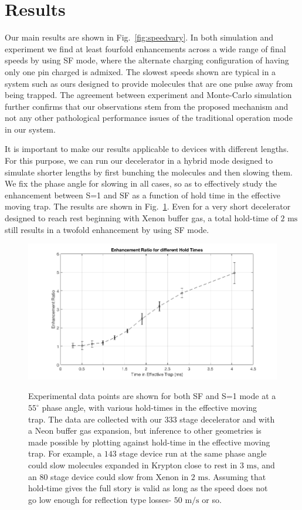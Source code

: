 \documentclass[%
 reprint,
 amsmath,amssymb,
 aps,
pra,
]{revtex4-1}
\begin{document}
\section{Results}
Our main results are shown in Fig.~\ref{fig:speedvary}. In both simulation and experiment we find at least fourfold enhancements across a wide range of final speeds by using SF mode, where the alternate charging configuration of having only one pin charged is admixed. The slowest speeds shown are typical in a system such as ours designed to provide molecules that are one pulse away from being trapped. The agreement between experiment and Monte-Carlo simulation further confirms that our observations stem from the proposed mechanism and not any other pathological performance issues of the traditional operation mode in our system.

It is important to make our results applicable to devices with different lengths. For this purpose, we can run our decelerator in a hybrid mode designed to simulate shorter lengths by first bunching the molecules and then slowing them. We fix the phase angle for slowing in all cases, so as to effectively study the enhancement between S=1 and SF as a function of hold time in the effective moving trap. The results are shown in Fig.~\ref{fig:holdtime}. Even for a very short decelerator designed to reach rest beginning with Xenon buffer gas, a total hold-time of $2\text{ ms}$ still results in a twofold enhancement by using SF mode.

\begin{figure}[t]
\includegraphics[width=\linewidth]{Data/ratio-holdtime.png}
\label{fig:holdtime}
\caption{
Experimental data points are shown for both SF and S=1 mode at a $55^\circ$ phase angle, with various hold-times in the effective moving trap. The data are collected with our $333$ stage decelerator and with a Neon buffer gas expansion, but inference to other geometries is made possible by plotting against hold-time in the effective moving trap. For example, a $143$ stage device run at the same phase angle could slow molecules expanded in Krypton close to rest in $3\text{ ms}$, and an $80$ stage device could slow from Xenon in $2\text{ ms}$. Assuming that hold-time gives the full story is valid as long as the speed does not go low enough for reflection type losses- $50\text{ m/s}$ or so.
}
\end{figure}
\end{document}

